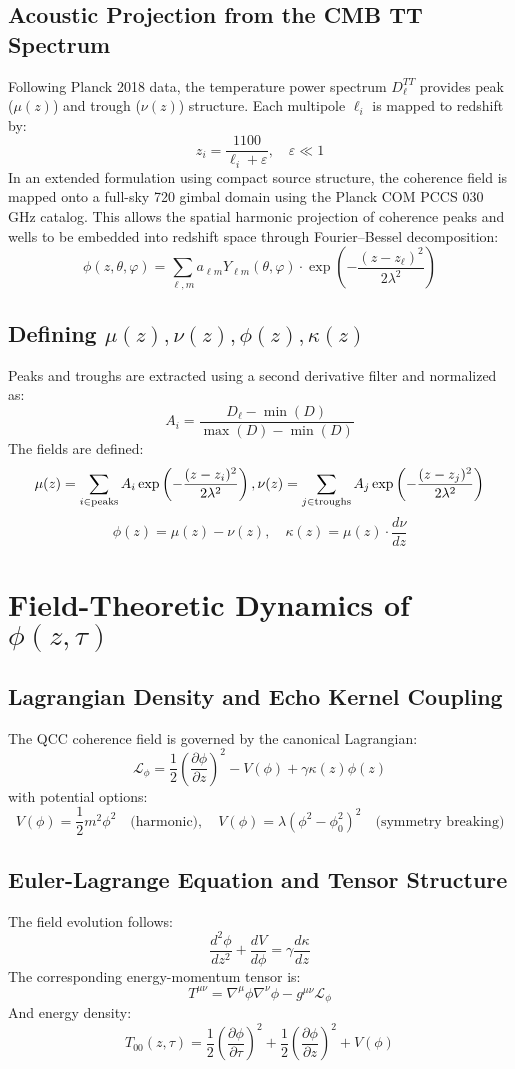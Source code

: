 \documentclass[12pt]{article}
\begin{document}
\subsection{Acoustic Projection from the CMB TT Spectrum}
Following Planck 2018 data, the temperature power spectrum \( D_\ell^{TT} \) provides peak (\( \mu(z) \)) and trough (\( \nu(z) \)) structure. Each multipole \( \ell_i \) is mapped to redshift by:
\[
z_i = \frac{1100}{\ell_i + \varepsilon}, \quad \varepsilon \ll 1
\]
In an extended formulation using compact source structure, the coherence field is mapped onto a full-sky 720\textdegree{} gimbal domain using the Planck COM PCCS 030 GHz catalog. This allows the spatial harmonic projection of coherence peaks and wells to be embedded into redshift space through Fourier--Bessel decomposition:
\[
\phi(z, \theta, \varphi) = \sum_{\ell, m} a_{\ell m} Y_{\ell m}(\theta, \varphi) \cdot \exp\left( -\frac{(z - z_\ell)^2}{2\lambda^2} \right)
\]

\subsection{Defining \( \mu(z), \nu(z), \phi(z), \kappa(z) \)}
Peaks and troughs are extracted using a second derivative filter and normalized as:
\[
A_i = \frac{D_\ell - \min(D)}{\max(D) - \min(D)}
\]
The fields are defined:
\[
\mu(z) = \sum_{i \in \text{peaks}} A_i \exp\left(-\frac{(z - z_i)^2}{2 \lambda^2}\right), \\
\nu(z) = \sum_{j \in \text{troughs}} A_j \exp\left(-\frac{(z - z_j)^2}{2 \lambda^2}\right)
\]
\[
\phi(z) = \mu(z) - \nu(z), \quad \kappa(z) = \mu(z) \cdot \frac{d\nu}{dz}
\]

\section{Field-Theoretic Dynamics of \( \phi(z, \tau) \)}
\subsection{Lagrangian Density and Echo Kernel Coupling}
The QCC coherence field is governed by the canonical Lagrangian:
\[
\mathcal{L}_\phi = \frac{1}{2}\left(\frac{\partial \phi}{\partial z}\right)^2 - V(\phi) + \gamma \kappa(z)\phi(z)
\]
with potential options:
\[
V(\phi) = \frac{1}{2}m^2 \phi^2 \quad \text{(harmonic)}, \quad V(\phi) = \lambda (\phi^2 - \phi_0^2)^2 \quad \text{(symmetry breaking)}
\]

\subsection{Euler-Lagrange Equation and Tensor Structure}
The field evolution follows:
\[
\frac{d^2 \phi}{dz^2} + \frac{dV}{d\phi} = \gamma \frac{d\kappa}{dz}
\]
The corresponding energy-momentum tensor is:
\[
T^{\mu\nu} = \nabla^\mu \phi \nabla^\nu \phi - g^{\mu\nu} \mathcal{L}_\phi
\]
And energy density:
\[
T_{00}(z, \tau) = \frac{1}{2} \left( \frac{\partial \phi}{\partial \tau} \right)^2 + \frac{1}{2} \left( \frac{\partial \phi}{\partial z} \right)^2 + V(\phi)
\]
\end{document}
